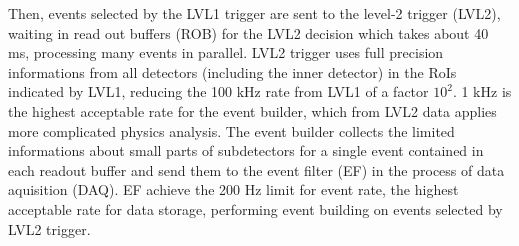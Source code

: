 Then, events selected by the LVL1 trigger are sent to the level-2 trigger (LVL2), waiting in read out buffers (ROB) for the LVL2 decision which takes about 40 ms, processing many events in parallel. LVL2 trigger uses full precision informations from all detectors (including the inner detector) in the RoIs indicated by LVL1, reducing the 100 kHz rate from LVL1 of a factor $10^{2}$. 
1 kHz is the highest acceptable rate for the event builder, which from LVL2 data applies more complicated physics analysis. The event builder collects the limited informations about small parts of subdetectors for a single event contained in each readout buffer and send them to the event filter (EF) in the process of data aquisition (DAQ). EF achieve the 200 Hz limit for event rate, the highest acceptable rate for data storage, performing event building on events selected by LVL2 trigger.

